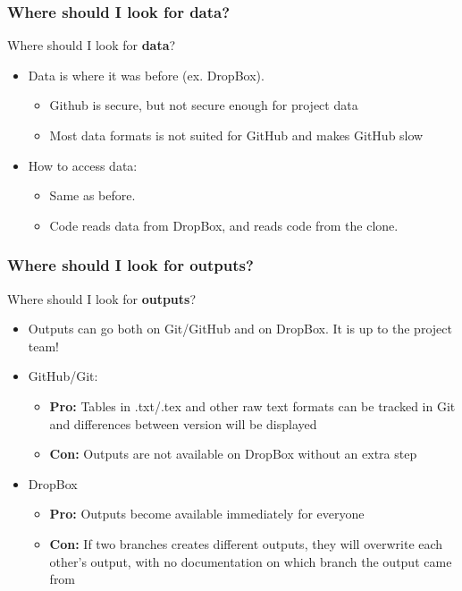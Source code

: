 \documentclass[aspectratio=169]{beamer} %
\begin{document}
\begin{frame}
	\frametitle{Where should I look for data?}
	
	Where should I look for \textbf{data}?
	
	\begin{itemize}
		\item Data is where it was before (ex. DropBox). 
		\begin{itemize}
			\item Github is secure, but not secure enough for project data
			\item Most data formats is not suited for GitHub and makes GitHub slow
		\end{itemize}
		\item How to access data:
		\begin{itemize}
			\item Same as before.
			\item Code reads data from DropBox, and reads code from the clone.
		\end{itemize}		
	\end{itemize}
\end{frame}

\begin{frame}
	\frametitle{Where should I look for outputs?}

	Where should I look for \textbf{outputs}?
	
	\begin{itemize}
		\item Outputs can go both on Git/GitHub and on DropBox. It is up to the project team!
		\item GitHub/Git:
		\begin{itemize}
			\item \textbf{Pro:} Tables in .txt/.tex and other raw text formats can be tracked in Git and differences between version will be displayed
			\item \textbf{Con:} Outputs are not available on DropBox without an extra step
		\end{itemize}
		\item DropBox
		\begin{itemize}
			\item \textbf{Pro:} Outputs become available immediately for everyone
			\item \textbf{Con:} If two branches creates different outputs, they will overwrite each other's output, with no documentation on which branch the output came from
		\end{itemize}		
	\end{itemize}
\end{frame}
\end{document}
